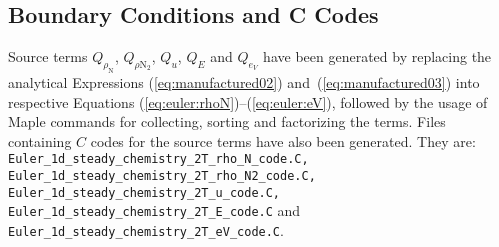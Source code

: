 \documentclass[10pt]{article}
\begin{document}
\subsection{Boundary Conditions and C Codes}

Source terms $Q_{\rho_\text{N} }$, $Q_{\rho \text{N}_{2}}$, $Q_u$, $Q_E$ and $Q_{e_V}$ have been generated by replacing the analytical Expressions (\ref{eq:manufactured02}) and~(\ref{eq:manufactured03}) into respective Equations (\ref{eq:euler:rhoN})--(\ref{eq:euler:eV}), followed by the usage of Maple commands for collecting, sorting and factorizing the terms. Files containing $C$ codes for the source terms have also been generated. They are: \texttt{ Euler\_1d\_steady\_chemistry\_2T\_rho\_N\_code.C, Euler\_1d\_steady\_chemistry\_2T\_rho\_N2\_code.C,\\ Euler\_1d\_steady\_chemistry\_2T\_u\_code.C, Euler\_1d\_steady\_chemistry\_2T\_E\_code.C} and \\
\texttt{Euler\_1d\_steady\_chemistry\_2T\_eV\_code.C}.
\end{document}
